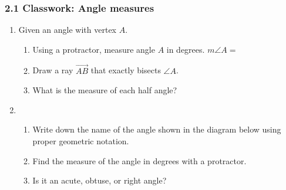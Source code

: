 

\fancyhead[LE]{\thepage}



\subsubsection*{2.1 Classwork: Angle measures}
\begin{enumerate}
\item Given an angle with vertex $A$.
  \begin{enumerate}[itemsep=0.5cm]
    \item Using a protractor, measure angle $A$ in degrees. $m\angle A =$
    \item Draw a ray $\overrightarrow{AB}$ that exactly bisects $\angle A$.
    \item What is the measure of each half angle?
  \end{enumerate}
  \begin{center}
  \end{center}

\item 
\begin{enumerate}
  \item Write down the name of the angle shown in the diagram below using proper geometric notation.
  \item Find the measure of the angle in degrees with a protractor.
  \item Is it an acute, obtuse, or right angle?
\end{enumerate}
    \begin{flushright}
    \end{flushright}


\end{enumerate}
